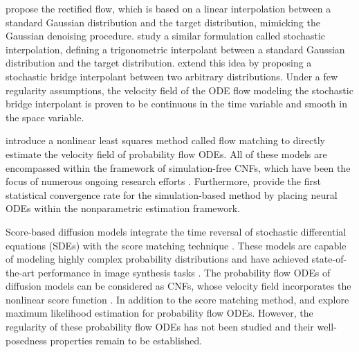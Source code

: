 \documentclass[twoside,11pt]{article}
\numberwithin{equation}{section}
\begin{document}
\citet{liu2023flow} propose the rectified flow, which is based on a linear interpolation between a standard Gaussian distribution and the target distribution, mimicking the Gaussian denoising procedure. \citet{albergo2023building} study a similar formulation called stochastic interpolation, defining a trigonometric interpolant between a standard Gaussian distribution and the target distribution. \citet{albergo2023stochastic} extend this idea by proposing a stochastic bridge interpolant between two arbitrary distributions. Under a few regularity assumptions, the velocity field of the ODE flow modeling the stochastic bridge interpolant is proven to be continuous in the time variable and smooth in the space variable. %

\citet{lipman2023flow} introduce a nonlinear least squares method called flow matching to directly estimate the velocity field of probability flow ODEs. All of these models are encompassed within the framework of simulation-free CNFs, which have been the focus of numerous ongoing research efforts \citep{neklyudov2023action, tong2023conditional, chen2023riemannian, albergo2023stochastic, shaul2023kinetic, pooladian2023multisample, albergo2023multimarginal, albergo2023dependent}. Furthermore, \citet{marzouk2023distribution} provide the first statistical convergence rate for the simulation-based method by placing neural ODEs within the nonparametric estimation framework.


Score-based diffusion models integrate the time reversal of stochastic differential equations (SDEs) with the score matching technique \citep{sohl2015deep, song2019generative, ho2020denoising, song2020improved, song2021scorebased, song2021denoising, debortoli2021diffusion}. These models are capable of modeling highly complex probability distributions and have achieved state-of-the-art performance in image synthesis tasks \citep{dhariwal2021diffusion, rombach2022high}. The probability flow ODEs of diffusion models can be considered as CNFs, whose velocity field incorporates the nonlinear score function \citep{song2021scorebased, karras2022elucidating, lu2022dpm, lu2022maximum, zheng2023improved}.
In addition to the score matching method, \citet{lu2022maximum} and \citet{zheng2023improved} explore maximum likelihood estimation for probability flow ODEs. However, the regularity of these probability flow ODEs has not been studied and their well-posedness properties remain to be established.
\end{document}
